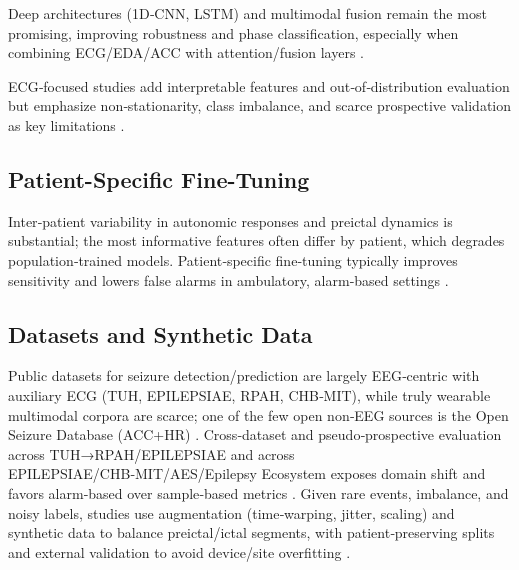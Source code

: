 Deep architectures (1D‑CNN, LSTM) and multimodal fusion remain the most promising, improving robustness and phase classification,
especially when combining ECG/EDA/ACC with attention/fusion layers
\parencite{yangMultimodalAISystem2022,pordoyEnhancedNonEEGMultimodal2025}.

ECG‑focused studies add interpretable features and out‑of‑distribution evaluation but emphasize non‑stationarity,
class imbalance, and scarce prospective validation as key limitations
\parencite{abtahiIdentificationRelevantECG2025,kalousiosECGbasedEpilepticSeizure2024}.

\subsection{Patient-Specific Fine-Tuning}
Inter‑patient variability in autonomic responses and preictal dynamics is substantial;
the most informative features often differ by patient, which degrades population‑trained models.
Patient‑specific fine‑tuning typically improves sensitivity and lowers false alarms in ambulatory, alarm‑based settings
\parencite{andradePerformanceSeizurePrediction2024}.

\subsection{Datasets and Synthetic Data}
Public datasets for seizure detection/prediction are largely EEG‑centric with auxiliary ECG
(TUH, EPILEPSIAE, RPAH, CHB‑MIT), while truly wearable multimodal corpora are scarce;
one of the few open non‑EEG sources is the Open Seizure Database (ACC+HR)
\parencite{yangMultimodalAISystem2022,pordoyEnhancedNonEEGMultimodal2025}.
Cross‑dataset and pseudo‑prospective evaluation across TUH→RPAH/EPILEPSIAE and across EPILEPSIAE/CHB‑MIT/AES/Epilepsy
Ecosystem exposes domain shift and favors alarm‑based over sample‑based metrics
\parencite{yangMultimodalAISystem2022,andradePerformanceSeizurePrediction2024}.
Given rare events, imbalance, and noisy labels, studies use augmentation (time‑warping, jitter, scaling)
and synthetic data to balance preictal/ictal segments, with patient‑preserving splits and external validation to
avoid device/site overfitting
\parencite{kalousiosECGbasedEpilepticSeizure2024,sethFeasibilityCardiacbasedSeizure2023}.

